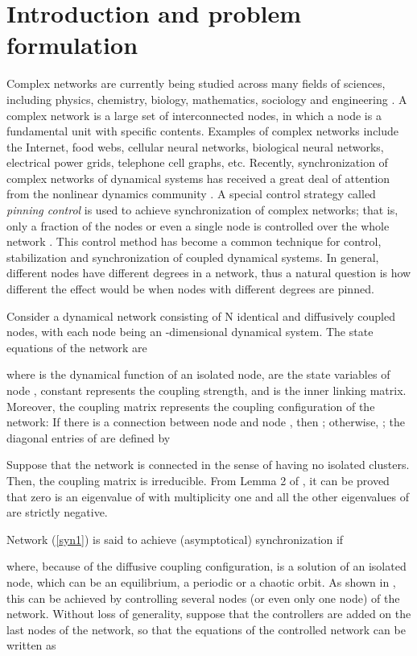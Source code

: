 \documentclass[11pt]{article}
\begin{document}
\section{Introduction and problem formulation}
\quad Complex networks are currently being studied across many
fields of sciences, including physics, chemistry, biology,
mathematics, sociology and engineering
\cite{r2,r12,r3,r5,r4,r11,r6,r1}. A complex network is a large set
of interconnected nodes, in which a node is a fundamental unit with
specific contents. Examples of complex networks include the
Internet, food webs, cellular neural networks, biological neural
networks, electrical power grids, telephone cell graphs, etc.
Recently, synchronization of complex networks of dynamical systems
has received a great deal of attention from the nonlinear dynamics
community \cite{jia54,r7,jia51,jia52,jia56}. A special control
strategy called \textit{pinning control} is used to achieve
synchronization of complex networks; that is, only a fraction of the
nodes or even a single node is controlled over the whole network
\cite{jia53,r8,jia55,jia57}. This control method has become a common
technique for control, stabilization and synchronization of coupled
dynamical systems. In general, different nodes have different
degrees in a network, thus a natural question is how different the
effect would be when nodes with different degrees are pinned.

Consider a dynamical network consisting of N identical and
diffusively coupled nodes, with each node being an -dimensional
dynamical system. The state equations of the network are

where  is the dynamical function of an isolated node,
 are the state variables
of node , constant  represents the coupling strength, and
 is the inner linking matrix. Moreover, the
coupling matrix  represents the
coupling configuration of the network: If there is a connection
between node  and node  , then ;
otherwise,  ; the diagonal entries of
 are defined by

Suppose that the network is connected in the sense of having no
isolated clusters. Then, the coupling matrix  is irreducible.
From Lemma 2 of \cite{jia56}, it can be proved that zero is an
eigenvalue of  with multiplicity one and all the other
eigenvalues of  are strictly negative.

Network (\ref{syn1}) is said to achieve (asymptotical)
synchronization if

where, because of the diffusive coupling configuration,  is a
solution of an isolated node, which can be an equilibrium, a
periodic or a chaotic orbit. As shown in
\cite{jia53,r8,jia55,jia57}, this can be achieved by controlling
several nodes (or even only one node) of the network. Without loss
of generality, suppose that the controllers are added on the last
 nodes of the network, so that the equations of the controlled
network can be written as
\end{document}
